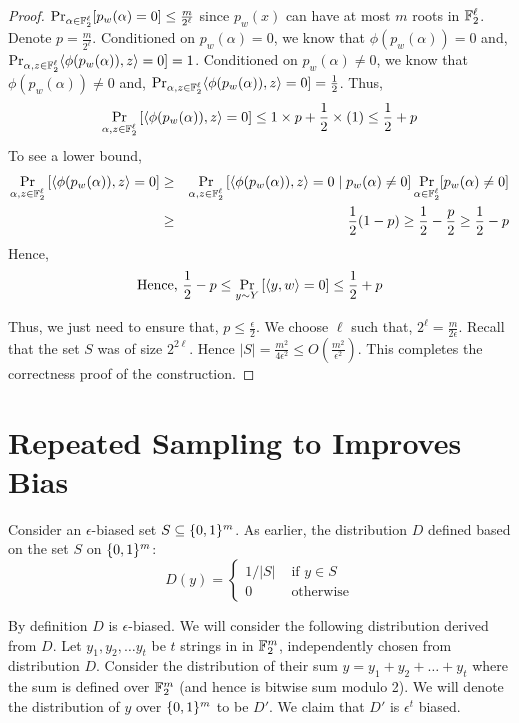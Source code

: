 \begin{proof}
$\Pr_{\alpha \in {\mathbb{F}}_2^\ell} [ p_w(\alpha) = 0 ] \le \frac{m}{2^\ell}$ since $p_w(x)$ can have at most $m$ roots in ${\mathbb{F}}_2^\ell$. Denote $p = \frac{m}{2^\ell}$.
Conditioned on $p_w(\alpha) = 0$, we know that $\phi(p_w(\alpha)) = 0$ and,
$\Pr_{\alpha,z \in {\mathbb{F}}_2^\ell} \langle \phi(p_w(\alpha)), z \rangle  = 0] = 1$.
Conditioned on $p_w(\alpha) \ne 0$, we know that $\phi(p_w(\alpha)) \ne 0$ and,
$\Pr_{\alpha,z \in {\mathbb{F}}_2^\ell} \langle \phi(p_w(\alpha)), z \rangle  = 0] = \frac{1}{2}$. Thus,
$$
\Pr_{\alpha, z \in {\mathbb{F}}_2^\ell} \left[\left\langle \phi(p_w(\alpha)), z \right\rangle  = 0 \right] 
\le 1 \times p + \frac{1}{2} \times (1) \le \frac{1}{2}+p 
$$
To see a lower bound, 
\begin{eqnarray*}
\Pr_{\alpha, z \in {\mathbb{F}}_2^\ell} \left[\left\langle \phi(p_w(\alpha)), z \right\rangle  = 0 \right] 
& \ge & 
\Pr_{\alpha, z \in {\mathbb{F}}_2^\ell} \left[\left\langle \phi(p_w(\alpha)), z \right\rangle  = 0 \mid p_w(\alpha) \ne 0 \right] \Pr_{\alpha \in {\mathbb{F}}_2^\ell} [ p_w(\alpha) \ne 0 ]  \\
& \ge & \frac{1}{2}(1-p) \ge \frac{1}{2} - \frac{p}{2} \ge \frac{1}{2} - p
\end{eqnarray*}
Hence, 
$$\textrm{Hence, } \frac{1}{2} - p \le \Pr_{y \sim Y} \left[ \langle y, w \rangle = 0 \right] \le \frac{1}{2}+p $$

Thus, we just need to ensure that, $p \le \frac{\epsilon}{2}$. We choose $\ell$ such that, $2^{\ell} = \frac{m}{2\epsilon}$. Recall that the set $S$ was of size $2^{2\ell}$. Hence $|S| = \frac{m^2}{4\epsilon^2} \le O\left(\frac{m^2}{\epsilon^2}\right)$. This completes the correctness proof of the construction.
\end{proof}

\section{Repeated Sampling to Improves Bias}

Consider an $\epsilon$-biased set $S \subseteq \{0,1\}^m$.
As earlier, the distribution $D$ defined based on the set $S$ on $\{0,1\}^m$:
\[
D(y) = \left\{
\begin{array}{ll}
1/|S| & \textrm{ if $y \in S$} \\
0 & \textrm{ otherwise}
\end{array}
\right.
\]

By definition $D$  is $\epsilon$-biased. We will consider the following distribution derived from $D$. Let $y_1, y_2, \ldots y_t$ be $t$ strings in in ${\mathbb{F}}_2^m$, independently chosen from distribution $D$. Consider the distribution of their sum $y = y_1+y_2+\ldots+y_t$ where the sum is defined over ${\mathbb{F}}_2^m$ (and hence is bitwise sum  modulo 2). We will denote the distribution of $y$ over $\{0,1\}^m$ to be  $D'$. We claim that $D'$ is $\epsilon^t$ biased.

